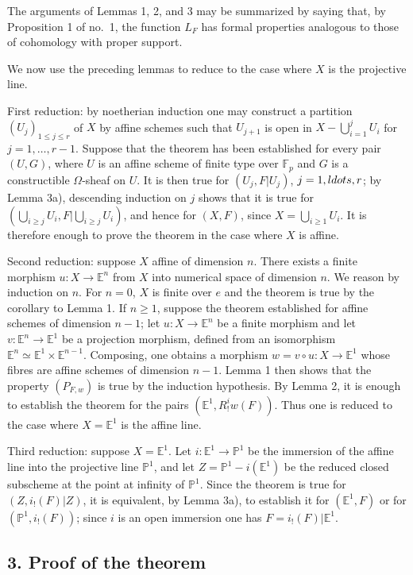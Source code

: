 \documentclass[11pt]{article}
\begin{document}
The arguments of Lemmas 1, 2, and 3 may be summarized by saying that, by Proposition 1 of no.~1, the function $L_F$ has formal properties analogous to those of cohomology with proper support.

We now use the preceding lemmas to reduce to the case where $X$ is the projective line.

First reduction: by noetherian induction one may construct a partition $(U_j)_{1\le j\le r}$ of $X$ by affine schemes such that $U_{j+1}$ is open in $X-\bigcup_{i=1}^jU_i$ for $j=1,\ldots,r-1$. Suppose that the theorem has been established for every pair $(U,G)$, where $U$ is an affine scheme of finite type over $\mathbb F_p$ and $G$ is a constructible $\Omega$-sheaf on $U$. It is then true for $(U_j,F|U_j)$, $j=1,\\ldots,r$; by Lemma 3a), descending induction on $j$ shows that it is true for $(\bigcup_{i\ge j}U_i,F|\bigcup_{i\ge j}U_i)$, and hence for $(X,F)$, since $X=\bigcup_{i\ge1}U_i$. It is therefore enough to prove the theorem in the case where $X$ is affine.

Second reduction: suppose $X$ affine of dimension $n$. There exists a finite morphism $u:X\to\mathbb E^n$ from $X$ into numerical space of dimension $n$. We reason by induction on $n$. For $n=0$, $X$ is finite over $e$ and the theorem is true by the corollary to Lemma 1. If $n\ge1$, suppose the theorem established for affine schemes of dimension $n-1$; let $u:X\to\mathbb E^n$ be a finite morphism and let $v:\mathbb E^n\to\mathbb E^1$ be a projection morphism, defined from an isomorphism $\mathbb E^n\simeq\mathbb E^1\times\mathbb E^{n-1}$. Composing, one obtains a morphism $w=v\circ u:X\to\mathbb E^1$ whose fibres are affine schemes of dimension $n-1$. Lemma 1 then shows that the property $(P_{F,w})$ is true by the induction hypothesis. By Lemma 2, it is enough to establish the theorem for the pairs $(\mathbb E^1,R^i_!w(F))$. Thus one is reduced to the case where $X=\mathbb E^1$ is the affine line.

Third reduction: suppose $X=\mathbb E^1$. Let $i:\mathbb E^1\to\mathbb P^1$ be the immersion of the affine line into the projective line $\mathbb P^1$, and let $Z=\mathbb P^1-i(\mathbb E^1)$ be the reduced closed subscheme at the point at infinity of $\mathbb P^1$. Since the theorem is true for $(Z,i_!(F)|Z)$, it is equivalent, by Lemma 3a), to establish it for $(\mathbb E^1,F)$ or for $(\mathbb P^1,i_!(F))$; since $i$ is an open immersion one has $F=i_!(F)|\mathbb E^1$.

\subsection*{3. Proof of the theorem}
\end{document}
